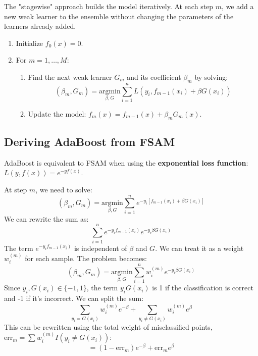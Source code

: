 \documentclass{article}
\begin{document}
\begin{multicols}{2}
	The "stagewise" approach builds the model iteratively. At each step $m$, we add a new weak learner to the ensemble without changing the parameters of the learners already added.
	\begin{enumerate}
		\item Initialize $f_0(x) = 0$.
		\item For $m = 1, \dots, M$:
		      \begin{enumerate}
			      \item Find the next weak learner $G_m$ and its coefficient $\beta_m$ by solving:
			            $$ (\beta_m, G_m) = \underset{\beta, G}{\text{argmin}} \sum_{i=1}^{n} L(y_i, f_{m-1}(x_i) + \beta G(x_i)) $$
			      \item Update the model: $f_m(x) = f_{m-1}(x) + \beta_m G_m(x)$.
		      \end{enumerate}
	\end{enumerate}

	\subsection{Deriving AdaBoost from FSAM}
	AdaBoost is equivalent to FSAM when using the \textbf{exponential loss function}: $L(y, f(x)) = e^{-y f(x)}$.

	At step $m$, we need to solve:
	$$ (\beta_m, G_m) = \underset{\beta, G}{\text{argmin}} \sum_{i=1}^{n} e^{-y_i [f_{m-1}(x_i) + \beta G(x_i)]} $$
	We can rewrite the sum as:
	$$ \sum_{i=1}^{n} e^{-y_i f_{m-1}(x_i)} e^{-y_i \beta G(x_i)} $$
	The term $e^{-y_i f_{m-1}(x_i)}$ is independent of $\beta$ and $G$. We can treat it as a weight $w_i^{(m)}$ for each sample. The problem becomes:
	$$ (\beta_m, G_m) = \underset{\beta, G}{\text{argmin}} \sum_{i=1}^{n} w_i^{(m)} e^{-y_i \beta G(x_i)} $$
	Since $y_i, G(x_i) \in \{-1, 1\}$, the term $y_i G(x_i)$ is 1 if the classification is correct and -1 if it's incorrect. We can split the sum:
	$$ \sum_{y_i = G(x_i)} w_i^{(m)} e^{-\beta} + \sum_{y_i \neq G(x_i)} w_i^{(m)} e^{\beta} $$
	This can be rewritten using the total weight of misclassified points, $\text{err}_m = \sum w_i^{(m)} I(y_i \neq G(x_i))$:
	$$ = (1 - \text{err}_m) e^{-\beta} + \text{err}_m e^{\beta} $$


\end{multicols}
\end{document}
